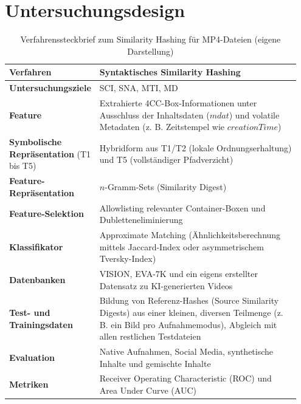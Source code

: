 \section{Untersuchungsdesign}
\label{sec:design}


\begin{table}[h]
    \centering
    \begin{tabular}{>{\raggedright\arraybackslash}p{0.2\linewidth}>{\raggedright\arraybackslash}p{0.75\linewidth}}\toprule
         \textbf{Verfahren}& Syntaktisches Similarity Hashing\\\midrule
         \textbf{Untersuchungsziele}& SCI, SNA, MTI, MD\\\midrule
         \textbf{Feature}& Extrahierte 4CC-Box-Informationen unter Ausschluss der Inhaltsdaten (\(mdat\)) und volatile Metadaten (z. B. Zeitstempel wie \(creationTime\))\\\midrule
         \textbf{Symbolische Repräsentation} (T1 bis T5)& Hybridform aus T1/T2 (lokale Ordnungserhaltung) und T5 (vollständiger Pfadverzicht)\\\midrule
         \textbf{Feature-Repräsentation}& \(n\)-Gramm-Sets (Similarity Digest)\\\midrule
         \textbf{Feature-Selektion}& Allowlisting relevanter Container-Boxen und Dubletteneliminierung\\\midrule
         \textbf{Klassifikator}& Approximate Matching (Ähnlichkeitsberechnung mittels Jaccard-Index oder asymmetrischem Tversky-Index)\\\midrule
         \textbf{Datenbanken}& VISION, EVA-7K und ein eigens erstellter Datensatz zu KI-generierten Videos\\\midrule
         \textbf{Test- und Trainingsdaten}& Bildung von Referenz-Hashes (Source Similarity Digests) aus einer kleinen, diversen Teilmenge (z. B. ein Bild pro Aufnahmemodus), Abgleich mit allen restlichen Testdateien\\\midrule
         \textbf{Evaluation}&Native Aufnahmen, Social Media, synthetische Inhalte und gemischte Inhalte\\\midrule
         \textbf{Metriken}&Receiver Operating Characteristic (ROC) und Area Under Curve (AUC)\\ \bottomrule 
    \end{tabular}
    \caption{Verfahrenssteckbrief zum Similarity Hashing für MP4-Dateien (eigene Darstellung)}
    \label{tab:steckbrief-mp4}
\end{table}

